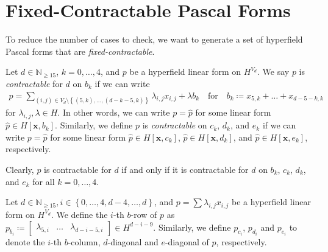 \section{Fixed-Contractable Pascal Forms}

To reduce the number of cases to check, we want to generate a set of hyperfield Pascal forms that are \emph{fixed-contractable}.

\begin{definition}
    Let \( d \in \mathbb{N}_{\geq 15} \), \( k = 0, \dots ,4 \), and \( p \) be a hyperfield linear form on \( H^{V_d} \). We say \( p \) is \emph{contractable} for \( d \) on \( b_k \) if we can write
    \begin{align*}
        p = \sum_{(i,j) \in V_d \setminus \left\{ (5,k), \dots, (d-k-5, k) \right\}} \lambda_{i,j} x_{i,j}  +\lambda b_k \quad \text{for} \quad b_k \coloneqq x_{5,k} + \dots + x_{d-5-k,k}
    \end{align*}
    for \( \lambda_{i,j}, \lambda \in H \). In other words, we can write \( p = \hat p \) for some linear form \( \hat p \in H[\mathbf{x}, b_k] \). 
    Similarly, we define \( p \) is \emph{contractable} on \( c_k \), \( d_k \), and \( e_k \) if we can write \( p = \hat p \) for some linear form \( \hat p \in H[\mathbf{x}, c_k] \), \( \hat p \in H[\mathbf{x}, d_k] \), and \( \hat p \in H[\mathbf{x}, e_k] \), respectively.
\end{definition}

\begin{remark}
    Clearly, \( p \) is contractable for \( d \) if and only if it is contractable for \( d \) on \( b_k \), \( c_k \), \( d_k \), and \( e_k \) for all \( k = 0, \dots, 4 \).
\end{remark}

\begin{definition}
    Let \( d \in \mathbb{N}_{\geq 15} , i \in \left\{ 0,\dots,4,d-4, \dots, d \right\}\), and $p = \sum \lambda_{i,j} x_{i,j}$ be a hyperfield linear form on \( H^{V_d} \). We define the $i$-th $b$-row of $p$ as \( p_{b_{i}} \coloneqq \begin{bmatrix} \lambda_{5,i} & \dots & \lambda_{d-i-5,i} \end{bmatrix} \in H^{d -  i - 9} \). Similarly, we define $p_{c_{i}}$, $p_{d_{i}}$ and $p_{e_{i}}$ to denote the $i$-th $b$-column, $d$-diagonal and $e$-diagonal of $p$, respectively.
  \end{definition}


